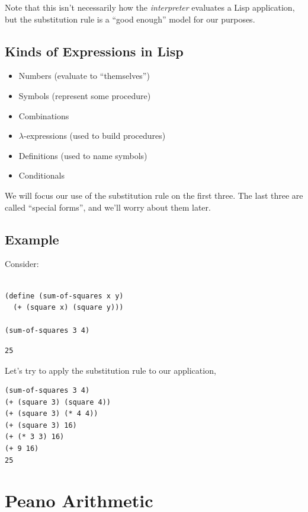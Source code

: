 \documentclass[9pt]{report}
\begin{document}
Note that this isn't necessarily how the \emph{interpreter} evaluates a
Lisp application, but the substitution rule is a ``good enough''
model for our purposes.

\subsection{Kinds of Expressions in Lisp}
\label{sec:orgb910d33}
\begin{itemize}
\item Numbers (evaluate to ``themselves'')
\item Symbols (represent some procedure)
\item Combinations
\item \(\lambda\)-expressions (used to build procedures)
\item Definitions (used to name symbols)
\item Conditionals
\end{itemize}

We will focus our use of the substitution rule on the first three.
The last three are called ``special forms'', and we'll worry about
them later.

\subsection{Example}
\label{sec:orgf52ea42}

Consider:

\begin{verbatim}

(define (sum-of-squares x y)
  (+ (square x) (square y)))

(sum-of-squares 3 4)
\end{verbatim}

\begin{verbatim}
25
\end{verbatim}


Let's try to apply the substitution rule to our application,

\begin{verbatim}
(sum-of-squares 3 4)
(+ (square 3) (square 4))
(+ (square 3) (* 4 4))
(+ (square 3) 16)
(+ (* 3 3) 16)
(+ 9 16)
25
\end{verbatim}

\section{Peano Arithmetic}
\label{sec:org77bbbf5}
\end{document}
